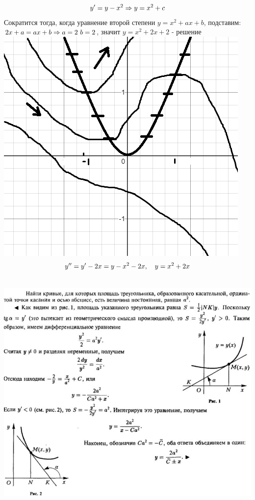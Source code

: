 \documentclass[12pt, fleqn]{article}
\begin{document}
\begin{example}
    \[y'=y-x^2 \Rightarrow y=x^2+c\]
    Сократится тогда, когда уравнение второй степени $y=x^2+ax+b$, подставим: $2x+a=ax+b \Rightarrow a=2 \ b=2$, значит $y=x^2+2x+2$ - решение\\
    \includegraphics[scale=0.3]{pics/resh5.png}
    \[y''=y'-2x=y-x^2-2x,\quad y=x^2+2x\]
\end{example}

\begin{example}\ \\
    \includegraphics[scale=0.7]{pics/z71.jpg}
\end{example}
\end{document}
